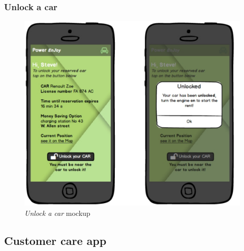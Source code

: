\subsubsection{Unlock a car}

\begin{figure}[h]
			\centering
			\includegraphics[width=0.9\linewidth]{mockups/unlockCar}
			\caption{
				\label{fig:unlockCar} 
				\emph{Unlock a car} mockup
			}
		\end{figure}
		
\subsection{Customer care app}